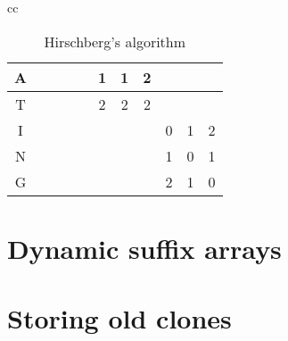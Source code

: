 \begin{table}
\begin{center}
\begin{tabular}[c]{cc}
{\begin{tabular}[c]{c|c|c|c|c|c|c|c|c|c|c|}
				A &                     &                     &                     &                       & \cellcolor{green!25}1 & \cellcolor{blue!25}1  & \cellcolor{green!25}2 &                       &                       &                       \\\hline
				T &                     &                     &                     &                       & \cellcolor{green!25}2 & \cellcolor{green!25}2 & \cellcolor{blue!25}2  &                       &                       &                       \\\hline
				I &                     &                     &                     &                       &                       &                       &                       & \cellcolor{blue!25}0  & \cellcolor{green!25}1 & \cellcolor{green!25}2 \\\hline
				N &                     &                     &                     &                       &                       &                       &                       & \cellcolor{green!25}1 & \cellcolor{blue!25}0  & \cellcolor{green!25}1 \\\hline
				G &                     &                     &                     &                       &                       &                       &                       & \cellcolor{green!25}2 & \cellcolor{green!25}1 & \cellcolor{blue!25}0  \\\hline
			\end{tabular}
		}
        \end{tabular}
	\end{center}
	\caption{Hirschberg's algorithm}
	\label{tab:hirschbergs}
\end{table}

\section{Dynamic suffix arrays}

\section{Storing old clones}

